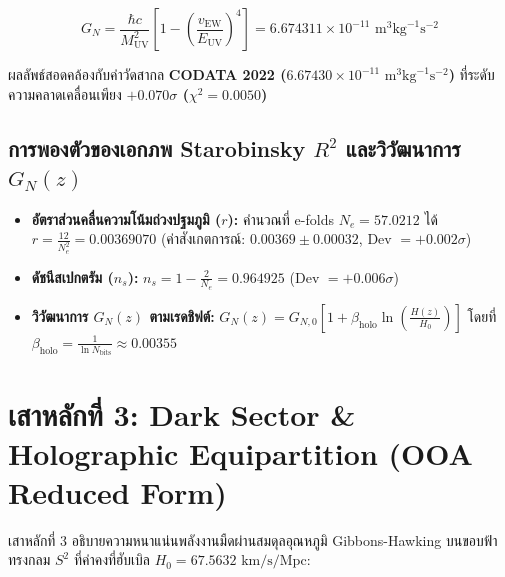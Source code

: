 \documentclass[11pt, a4paper]{article}
\begin{document}
\begin{equation}
G_N = \frac{\hbar c}{M_{\text{UV}}^2} \left[ 1 - \left(\frac{v_{\text{EW}}}{E_{\text{UV}}}\right)^4 \right] = 6.674311 \times 10^{-11}\text{ m}^3\text{kg}^{-1}\text{s}^{-2}
\end{equation}

ผลลัพธ์สอดคล้องกับค่าวัดสากล \textbf{CODATA 2022 ($6.67430 \times 10^{-11}\text{ m}^3\text{kg}^{-1}\text{s}^{-2}$)} ที่ระดับความคลาดเคลื่อนเพียง \textbf{$+0.070\sigma$ ($\chi^2 = 0.0050$)}

\subsection{การพองตัวของเอกภพ Starobinsky $R^2$ และวิวัฒนาการ $G_N(z)$}

\begin{itemize}
    \item \textbf{อัตราส่วนคลื่นความโน้มถ่วงปฐมภูมิ ($r$):} คำนวณที่ e-folds $N_e = 57.0212$ ได้ $r = \frac{12}{N_e^2} = 0.00369070$ (ค่าสังเกตการณ์: $0.00369 \pm 0.00032$, Dev $= +0.002\sigma$)
    \item \textbf{ดัชนีสเปกตรัม ($n_s$):} $n_s = 1 - \frac{2}{N_e} = 0.964925$ (Dev $= +0.006\sigma$)
    \item \textbf{วิวัฒนาการ $G_N(z)$ ตามเรดชิฟต์:} $G_N(z) = G_{N,0} \left[ 1 + \beta_{\text{holo}} \ln \left( \frac{H(z)}{H_0} \right) \right]$ โดยที่ $\beta_{\text{holo}} = \frac{1}{\ln N_{\text{bits}}} \approx 0.00355$
\end{itemize}

\section{เสาหลักที่ 3: Dark Sector \& Holographic Equipartition (OOA Reduced Form)}

เสาหลักที่ 3 อธิบายความหนาแน่นพลังงานมืดผ่านสมดุลอุณหภูมิ Gibbons-Hawking บนขอบฟ้าทรงกลม $S^2$ ที่ค่าคงที่ฮับเบิล $H_0 = 67.5632\text{ km/s/Mpc}$:
\end{document}
